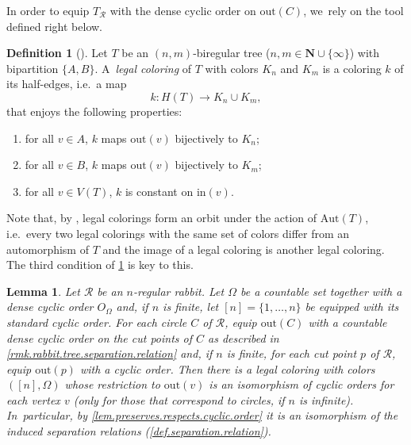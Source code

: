 \documentclass[10pt,a4paper]{amsart}
\newcommand{\ie}{i.e.\ }
\newtheorem{lemma}[lemma]{Lemma}
\theoremstyle{definition}
\newtheorem{definition}[definition]{Definition}
\newcommand{\Aut}{\mathrm{Aut}}
\newcommand{\R}{\mathcal{R}}
\begin{document}
In order to equip $T_\R$ with the dense cyclic order on $\mathrm{out}(C)$, we~rely on the tool defined right below.

\begin{definition}[\cite{biregular}]
\label{def.legal.coloring}
Let $T$ be an $(n,m)$-biregular tree ($n, m \in \mathbf{N} \cup \{\infty\}$) with bipartition $\{A,B\}$. A~\emph{legal coloring} of $T$ with colors $K_n$ and $K_m$ is a coloring $k$ of its half-edges, \ie a map
\[
 k \colon H(T) \to K_n \cup K_m, 
\]
that enjoys the following properties:
\begin{enumerate}
\item for all $v \in A$, $k$ maps $\mathrm{out}(v)$ bijectively to $K_n$;
\item for all $v \in B$, $k$ maps $\mathrm{out}(v)$ bijectively to $K_m$;
\item for all $v \in V(T)$, $k$ is constant on $\mathrm{in}(v)$.
\end{enumerate}
\end{definition}


Note that, by \cite[Prop.\,11]{biregular}, legal colorings form an orbit under the action of $\Aut(T)$, \ie every two legal colorings with the same set of colors differ from an automorphism of $T$ and the image of a legal coloring is another legal coloring.
The third condition of \cref{def.legal.coloring} is key to this.

\begin{lemma}
\label{lem.coloring.of.tree.of.circles}
Let $\R$ be an $n$-regular rabbit.
Let $\Omega$ be a countable set together with a dense cyclic order $O_\Omega$ and, if $n$ is finite, let $[n] = \{1, \dots, n\}$ be equipped with its standard cyclic order.
For each circle $C$ of $\R$, equip $\mathrm{out}(C)$ with a countable dense cyclic order on the cut points of $C$ as described in \cref{rmk.rabbit.tree.separation.relation} and, if $n$ is finite, for each cut point $p$ of $\R$, equip $\mathrm{out}(p)$ with a cyclic order.
Then there is a legal coloring with colors $([n],\Omega)$ whose restriction to $\mathrm{out}(v)$ is an isomorphism of cyclic orders for each vertex $v$ (only for those that correspond to circles, if $n$ is infinite). In~particular, by \cref{lem.preserves.respects.cyclic.order} it is an isomorphism of the induced separation relations (\cref{def.separation.relation}).
\end{lemma}
\end{document}
